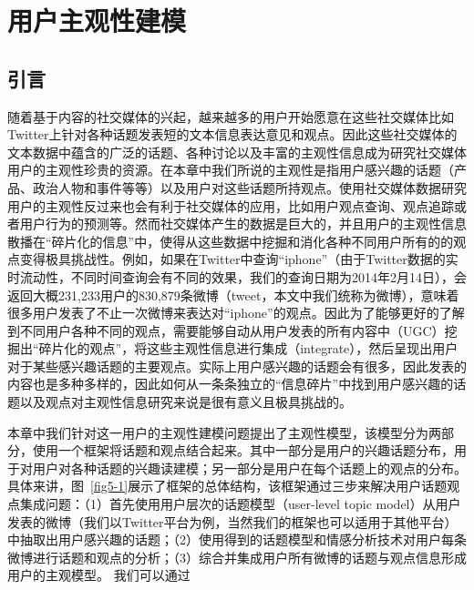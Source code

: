 \chapter{用户主观性建模}
\label{ch5}

\section{引言}
随着基于内容的社交媒体的兴起，越来越多的用户开始愿意在这些社交媒体比如Twitter上针对各种话题发表短的文本信息表达意见和观点。因此这些社交媒体的文本数据中蕴含的广泛的话题、各种讨论以及丰富的主观性信息成为研究社交媒体用户的主观性珍贵的资源。在本章中我们所说的主观性是指用户感兴趣的话题（产品、政治人物和事件等等）以及用户对这些话题所持观点。使用社交媒体数据研究用户的主观性反过来也会有利于社交媒体的应用，比如用户观点查询、观点追踪或者用户行为的预测等。然而社交媒体产生的数据是巨大的，并且用户的主观性信息散播在“碎片化的信息”中，使得从这些数据中挖掘和消化各种不同用户所有的的观点变得极具挑战性。例如，如果在Twitter中查询“iphone”（由于Twitter数据的实时流动性，不同时间查询会有不同的效果，我们的查询日期为2014年2月14日），会返回大概231,233用户的830,879条微博（tweet，本文中我们统称为微博），意味着很多用户发表了不止一次微博来表达对“iphone”的观点。因此为了能够更好的了解到不同用户各种不同的观点，需要能够自动从用户发表的所有内容中（UGC）挖掘出“碎片化的观点”，将这些主观性信息进行集成（integrate），然后呈现出用户对于某些感兴趣话题的主要观点。实际上用户感兴趣的话题会有很多，因此发表的内容也是多种多样的，因此如何从一条条独立的“信息碎片”中找到用户感兴趣的话题以及观点对主观性信息研究来说是很有意义且极具挑战的。

本章中我们针对这一用户的主观性建模问题提出了主观性模型，该模型分为两部分，使用一个框架将话题和观点结合起来。其中一部分是用户的兴趣话题分布，用于对用户对各种话题的兴趣读建模；另一部分是用户在每个话题上的观点的分布。具体来讲，图~\ref{fig5-1}展示了框架的总体结构，该框架通过三步来解决用户话题观点集成问题：（1）首先使用用户层次的话题模型（user-level topic model）从用户发表的微博（我们以Twitter平台为例，当然我们的框架也可以适用于其他平台）中抽取出用户感兴趣的话题；（2）使用得到的话题模型和情感分析技术对用户每条微博进行话题和观点的分析；（3）综合并集成用户所有微博的话题与观点信息形成用户的主观模型。
我们可以通过

